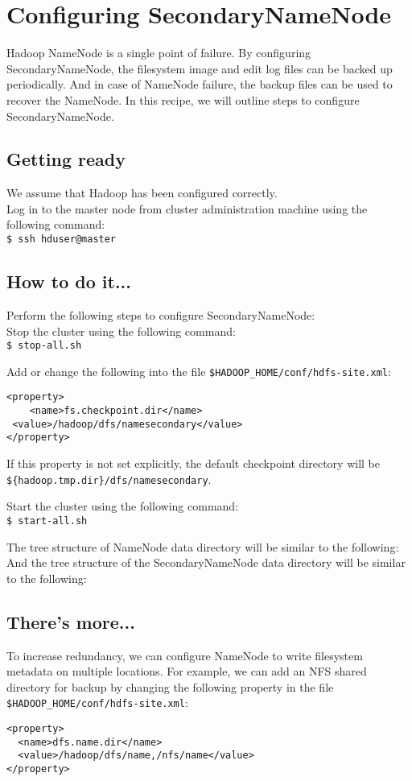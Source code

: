 \section{Configuring SecondaryNameNode}
Hadoop NameNode is a single point of failure. By configuring SecondaryNameNode, the filesystem image and edit log files can be backed up periodically. And in case of NameNode failure, the backup files can be used to recover the NameNode. In this recipe, we will outline steps to configure SecondaryNameNode.
\subsection*{Getting ready}
We assume that Hadoop has been configured correctly.\\
Log in to the master node from cluster administration machine using the following command:\\
\verb|$ ssh hduser@master|

\subsection*{How to do it...}
Perform the following steps to configure SecondaryNameNode: \\
Stop the cluster using the following command: \\
\verb|$ stop-all.sh|

Add or change the following into the file \verb|$HADOOP_HOME/conf/hdfs-site.xml|: 
\begin{verbatim}
<property>
    <name>fs.checkpoint.dir</name>
 <value>/hadoop/dfs/namesecondary</value>
</property>
\end{verbatim}

If this property is not set explicitly, the default checkpoint directory will be \verb|${hadoop.tmp.dir}/dfs/namesecondary|.

Start the cluster using the following command: \\
\verb|$ start-all.sh|

The tree structure of NameNode data directory will be similar to the following:\\

And the tree structure of the SecondaryNameNode data directory will be similar to the following:\\ 

\subsection*{There's more...}
To increase redundancy, we can configure NameNode to write filesystem metadata on multiple locations. For example, we can add an NFS shared directory for backup by changing the following property in the file \verb|$HADOOP_HOME/conf/hdfs-site.xml|:
\begin{verbatim}
<property>
  <name>dfs.name.dir</name>
  <value>/hadoop/dfs/name,/nfs/name</value>
</property>
\end{verbatim}

